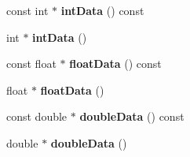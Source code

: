 \begin{DoxyCompactItemize}
\item 
const int $\ast$ {\bfseries int\-Data} () const \label{classCALICE_1_1NoiseParameter_ab49c24a64e65f2233dcde0c1eec61781}

\item 
int $\ast$ {\bfseries int\-Data} ()\label{classCALICE_1_1NoiseParameter_a70ec4f6c64502b5db07d3ea74c2e46dd}

\item 
const float $\ast$ {\bfseries float\-Data} () const \label{classCALICE_1_1NoiseParameter_a43e6abb3eb0f278e4ec8b6f0a7b91ca2}

\item 
float $\ast$ {\bfseries float\-Data} ()\label{classCALICE_1_1NoiseParameter_a5044799613596b5e3547e2c9e01e9098}

\item 
const double $\ast$ {\bfseries double\-Data} () const \label{classCALICE_1_1NoiseParameter_a17f9f7964cbde3a5b67bfcac3412dd23}

\item 
double $\ast$ {\bfseries double\-Data} ()\label{classCALICE_1_1NoiseParameter_ad770a3fe04039177f6913d9490d1443e}

\end{DoxyCompactItemize}
